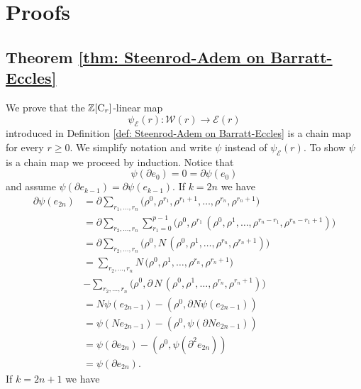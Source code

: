 
\section{Proofs} \label{s:proofs}

\subsection{Theorem \ref{thm: Steenrod-Adem on Barratt-Eccles}}

We prove that the $\mathbb{Z}[\mathrm{C}_r]$-linear map
\begin{equation*}
\psi_{\mathcal E}(r) : \mathcal W(r) \to \mathcal E(r)
\end{equation*}
introduced in Definition \ref{def: Steenrod-Adem on Barratt-Eccles} is a chain map for every $r \geq 0$. We simplify notation and write $\psi$ instead of $\psi_{\mathcal E}(r)$. To show $\psi$ is a chain map we proceed by induction. Notice that
\begin{equation*}
\psi(\partial e_0) = 0 = \partial \psi(e_0)
\end{equation*}
and assume $\psi(\partial e_{k-1}) = \partial \psi(e_{k-1})$. If $k = 2n$ we have
\begin{align*}
\partial \psi(e_{2n}) & = 
\partial \sum_{r_1, \dots, r_n} 
\big(\rho^0, \rho^{r_1}, \rho^{r_1+1}, \dots, \rho^{r_n}, \rho^{r_n+1} \big)  \\ & =
\partial \sum_{r_2, \dots, r_n} \sum_{r_1 = 0}^{p-1}
\big(\rho^0, \rho^{r_1} \, (\rho^0, \rho^{1}, \dots, \rho^{r_n-r_1}, \rho^{r_n - r_1 +1}) \big) \\ & =
\partial \sum_{r_2, \dots, r_n}
\big(\rho^0, N\, (\rho^{0}, \rho^{1}, \dots, \rho^{r_n}, \rho^{r_n + 1}) \big) \\ & =
\sum_{r_2, \dots, r_n}
N\, \big( \rho^{0}, \rho^{1}, \dots, \rho^{r_n}, \rho^{r_n + 1} \big) \\ & -
\sum_{r_2, \dots, r_n}
\big(\rho^0, \partial \, N \, (\rho^{0}, \rho^{1}, \dots, \rho^{r_n}, \rho^{r_n+1}) \big) \\ & =
N \psi(e_{2n-1}) - (\rho^0, \partial N \psi (e_{2n-1})) \\ & =
\psi(N e_{2n-1}) - (\rho^0, \psi (\partial N e_{2n-1})) \\ & =
\psi(\partial e_{2n}) - (\rho^0, \psi (\partial^2 e_{2n})) \\ & =
\psi(\partial e_{2n}).
\end{align*}
If $k = 2n+1$ we have
